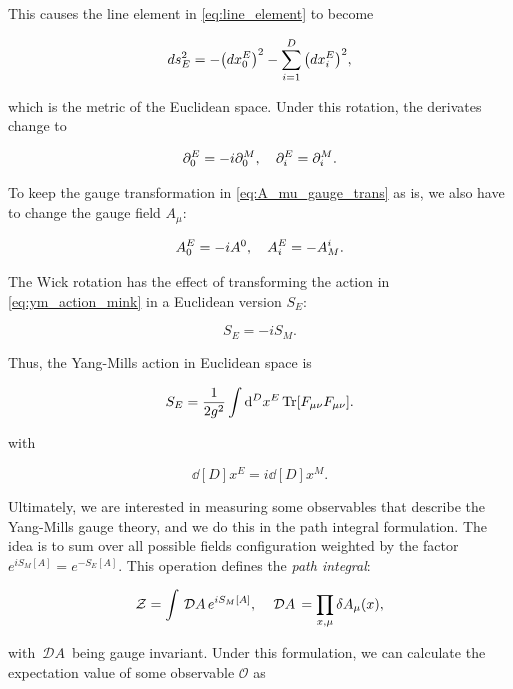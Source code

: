 \documentclass[reqno,12pt]{article}
\numberwithin{equation}{section}
\newcommand{\D}[1]{\,\mathcal{D}#1\,}
\newcommand{\Z}{\mathcal{Z}}
\begin{document}
This causes the line element in \eqref{eq:line_element} to become

\begin{equation}
	ds_E^2 = -\qty(dx^E_0)^2 - \sum_{i=1}^D \qty(dx^E_i)^2,
\end{equation}

which is the metric of the Euclidean space. Under this rotation, the derivates change to

\begin{equation}
	\partial_0^E = -i \partial_0^M \qc \partial_i^E = \partial_i^M.
\end{equation}

To keep the gauge transformation in \eqref{eq:A_mu_gauge_trans} as is, we also have to change the gauge field $A_\mu$:

\begin{equation}
	A_0^E = -i A^0 \qc A_i^E = -A^i_M.
\end{equation}

The Wick rotation has the effect of transforming the action in \eqref{eq:ym_action_mink} in a Euclidean version $S_E$:

\begin{equation}
	S_E = -i S_M.
\end{equation}

Thus, the Yang-Mills action in Euclidean space is

\begin{equation} \label{eq:ym_action}
	S_E = \frac{1}{2g^2} \int \dd[D]{x^E} \Tr[F_{\mu\nu}F_{\mu\nu}].
\end{equation}

with 

\begin{equation}
	\dd[D]{x^E} = i \dd[D]{x^M}.
\end{equation}

Ultimately, we are interested in measuring some observables that describe the Yang-Mills gauge theory, and we
do this in the path integral formulation. The idea is to
sum over all possible fields configuration weighted by the factor $e^{iS_M[A]} = e^{-S_E[A]}$.
This operation defines the \textit{path integral}:

\begin{equation} \label{eq:path_integral_mink}
	\Z = \int \D{A} e^{iS_M[A]} \qc \D{A} = \prod_{x, \mu} \delta A_\mu(x),
\end{equation}

with $\D{A}$ being gauge invariant. 
Under this formulation, we can calculate the expectation value of
some observable $\mathcal{O}$ as 
\end{document}
